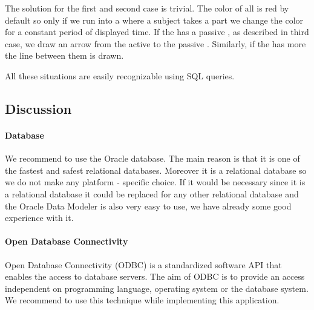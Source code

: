  The solution for the first and second case is trivial. The color of all  is red by default so only if we run into a  where a subject takes a part we change the color for a constant period of displayed time. If the  has a passive , as described in third case, we draw an arrow from the active to the passive . Similarly, if the  has more  the line between them is drawn.  
 
 All these situations are easily recognizable using SQL queries. 
% 
% 
% 
 
 
\subsection{Discussion} \label{Discussion}

\paragraph{Database} %

We recommend to use the Oracle database. The main reason is that it is one of the fastest and safest relational databases. Moreover it is a relational database so we do not make any platform - specific choice. If it would be necessary since it is a relational database it could be replaced for any other relational database and the Oracle Data Modeler is also very easy to use, we have already some good experience with it. 

\paragraph{Open Database Connectivity}
Open Database Connectivity (ODBC) is a standardized software API that enables the access to database servers. The aim of ODBC is to provide an access independent on programming language, operating system or the database system. We recommend to use this technique while implementing this application. 

